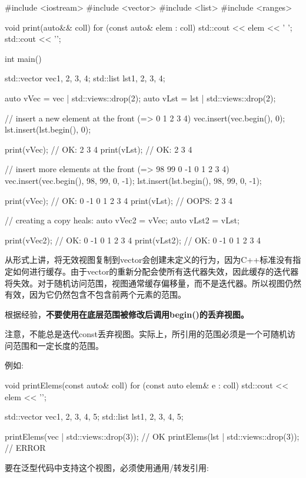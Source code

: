 \begin{cpp}
#include <iostream>
#include <vector>
#include <list>
#include <ranges>

void print(auto&& coll)
{
	for (const auto& elem : coll) {
		std::cout << elem << ' ';
	}
	std::cout << '\n';
}

int main()
{
	std::vector vec{1, 2, 3, 4};
	std::list lst{1, 2, 3, 4};
	
	auto vVec = vec | std::views::drop(2);
	auto vLst = lst | std::views::drop(2);
	
	// insert a new element at the front (=> 0 1 2 3 4)
	vec.insert(vec.begin(), 0);
	lst.insert(lst.begin(), 0);
	
	print(vVec); // OK: 2 3 4
	print(vLst); // OK: 2 3 4
	
	// insert more elements at the front (=> 98 99 0 -1 0 1 2 3 4)
	vec.insert(vec.begin(), {98, 99, 0, -1});
	lst.insert(lst.begin(), {98, 99, 0, -1});
	
	print(vVec); // OK: 0 -1 0 1 2 3 4
	print(vLst); // OOPS: 2 3 4
	
	// creating a copy heals:
	auto vVec2 = vVec;
	auto vLst2 = vLst;
	
	print(vVec2); // OK: 0 -1 0 1 2 3 4
	print(vLst2); // OK: 0 -1 0 1 2 3 4
}
\end{cpp}

从形式上讲，将无效视图复制到vector会创建未定义的行为，因为C++标准没有指定如何进行缓存。由于vector的重新分配会使所有迭代器失效，因此缓存的迭代器将失效。对于随机访问范围，视图通常缓存偏移量，而不是迭代器。所以视图仍然有效，因为它仍然包含不包含前两个元素的范围。

根据经验，\textbf{不要使用在底层范围被修改后调用begin()的丢弃视图。}


注意，不能总是迭代const丢弃视图。实际上，所引用的范围必须是一个可随机访问范围和一定长度的范围。

例如:

\begin{cpp}
void printElems(const auto& coll) {
	for (const auto elem& e : coll) {
		std::cout << elem << '\n';
	}
}

std::vector vec{1, 2, 3, 4, 5};
std::list lst{1, 2, 3, 4, 5};

printElems(vec | std::views::drop(3)); // OK
printElems(lst | std::views::drop(3)); // ERROR
\end{cpp}

要在泛型代码中支持这个视图，必须使用通用/转发引用:

